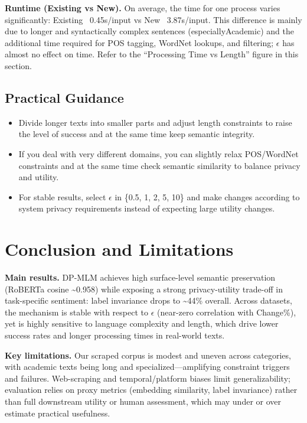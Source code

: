 \documentclass[11pt]{article}
\begin{document}
\noindent\textbf{Runtime (Existing vs New).} On average, the time for one process varies significantly: Existing ~0.45s/input vs New ~3.87s/input. This difference is mainly due to longer and syntactically complex sentences (especiallyAcademic) and the additional time required for POS tagging, WordNet lookups, and filtering; $\epsilon$ has almost no effect on time. Refer to the “Processing Time vs Length” figure in this section.

\subsection{Practical Guidance}
\begin{itemize}[leftmargin=*]
  \item Divide longer texts into smaller parts and adjust length constraints to raise the level of success and at the same time keep semantic integrity.
  \item If you deal with very different domains, you can slightly relax POS/WordNet constraints and at the same time check semantic similarity to balance privacy and utility.
  \item For stable results, select $\epsilon$ in \{0.5, 1, 2, 5, 10\} and make changes according to system privacy requirements instead of expecting large utility changes.
\end{itemize}

\section{Conclusion and Limitations}

\textbf{Main results.} DP-MLM achieves high surface-level semantic preservation (RoBERTa cosine \textasciitilde{}0.958) while exposing a strong privacy-utility trade-off in task-specific sentiment: label invariance drops to \textasciitilde{}44\% overall. Across datasets, the mechanism is stable with respect to $\epsilon$ (near-zero correlation with Change\%), yet is highly sensitive to language complexity and length, which drive lower success rates and longer processing times in real-world texts.

\textbf{Key limitations.} Our scraped corpus is modest and uneven across categories, with academic texts being long and specialized—amplifying constraint triggers and failures. Web-scraping and temporal/platform biases limit generalizability; evaluation relies on proxy metrics (embedding similarity, label invariance) rather than full downstream utility or human assessment, which may under or over estimate practical usefulness.
\end{document}
